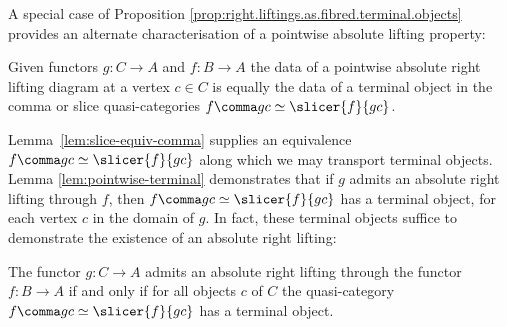 A special case of Proposition \ref{prop:right.liftings.as.fibred.terminal.objects} provides an alternate characterisation of a pointwise absolute lifting property:

\begin{lem}\label{lem:pointwise-terminal}
Given functors $g \colon C \to A$ and $f \colon B \to A$ the data of a pointwise absolute right lifting diagram at a vertex $c \in C$ is equally the data of a terminal object in the comma or slice quasi-categories $f \comma gc \simeq \slicer{f}{gc}$.
\end{lem}

Lemma~\ref{lem:slice-equiv-comma} supplies an equivalence $f \comma gc \simeq \slicer{f}{gc}$ along which we may transport terminal objects. Lemma \ref{lem:pointwise-terminal} demonstrates that if $g$ admits an absolute right lifting through $f$, then $f\comma gc \simeq \slicer{f}{gc}$ has a terminal object, for each vertex $c$ in the domain of $g$. In fact, these terminal objects suffice to demonstrate the existence of an absolute right lifting:

\begin{thm}\label{thm:pointwise} The functor $g\colon C\to A$ admits an absolute right lifting through the functor $f\colon B\to A$ if and only if for all objects $c$ of $C$ the quasi-category $f\comma gc\simeq\slicer{f}{gc}$ has a terminal object.
\end{thm}









